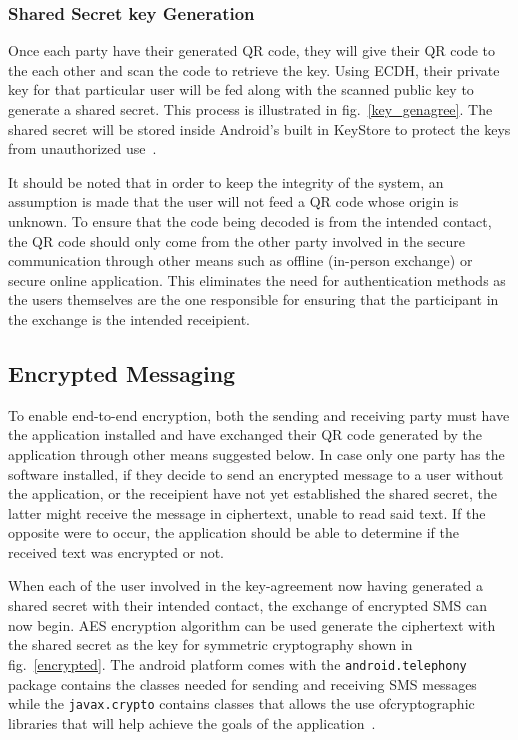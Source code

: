 \documentclass[journal]{./IEEE/IEEEtran}
\begin{document}
\subsubsection{Shared Secret key Generation}
Once each party have their generated QR code, they will give their QR code to
the each other and scan the code to retrieve the key. Using ECDH,
their private key for that particular user will be fed along with the scanned
public key to generate a shared secret. This process is illustrated in
fig.~\ref{key_genagree}.
The shared secret will be stored inside Android's built in KeyStore to protect
the keys from unauthorized use~\cite{android_keystore}.

It should be noted that in order to keep the integrity of the system,
an assumption is made that the user will not feed a QR code
whose origin is unknown. To ensure that the code being decoded is from the
intended contact, the QR code should only come from the other party involved
in the secure communication through other means such as offline
(in-person exchange) or secure online application. This eliminates the need
for authentication methods as the users themselves are the one responsible
for ensuring that the participant in the exchange is the intended receipient.
\subsection{Encrypted Messaging}
To enable end-to-end encryption, both the sending and receiving party must
have the application installed and have exchanged their QR code generated by
the application through other means suggested below. In case only one party
has the software installed, if they decide to send an encrypted message to
a user without the application, or the receipient have not yet established the
shared secret, the latter might receive the message in
ciphertext, unable to read said text. If the opposite were to occur,
the application should be able to determine if the received text was encrypted
or not.

When each of the user involved in the key-agreement now having generated a
shared secret with their intended contact, the exchange of encrypted SMS
can now begin. AES encryption algorithm can be used generate the ciphertext
with the shared secret as the key for symmetric cryptography shown in
fig.~\ref{encrypted}. The android platform comes with the
\lstinline{android.telephony} package contains the classes needed for sending
and receiving SMS messages while the \lstinline{javax.crypto} contains
classes that allows the use ofcryptographic libraries that will help achieve
the goals of the application~\cite{android_pkg}.
\end{document}
